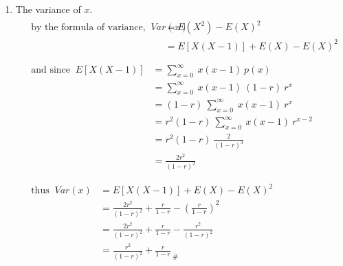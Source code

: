 \begin{enumerate}
        \item The variance of $x$.
            \begin{align*}
                &\begin{aligned}
                    \text{by the formula of variance, } \ Var(x) &= E(X^2) - E(X)^2\\
                    &= E[X(X-1)] + E(X) - E(X)^2\\
                \end{aligned}\\
                &\begin{aligned}
                    \text{and since }\  E[X(X-1)] &= \sum_{x=0}^{\infty}\ x(x-1)\ p(x)\\
                    &= \sum_{x=0}^{\infty}\ x(x-1)\ (1-r) \ r^x\\
                    &= (1-r) \ \sum_{x=0}^{\infty}\ x(x-1)\ r^x\\
                    &= r^2(1-r) \ \sum_{x=0}^{\infty}\ x(x-1)\ r^{x-2}\\
                    &= r^2(1-r) \ \frac{2}{(1-r)^3}\\
                    &= \frac{2r^2}{(1-r)^2}\\
                \end{aligned}\\            
                &\begin{aligned}
                    \text{thus } \  Var(x) &= E[X(X-1)] + E(X) - E(X)^2\\
                    &= \frac{2r^2}{(1-r)^2} + \frac{r}{1-r} - \left(\frac{r}{1-r}\right)^2\\
                    &= \frac{2r^2}{(1-r)^2} + \frac{r}{1-r} - \frac{r^2}{(1-r)^2}\\
                    &= \frac{r^2}{(1-r)^2} + \frac{r}{1-r}_{ \ \#}\\
                \end{aligned}\\
            \end{align*}
        
    \end{enumerate}